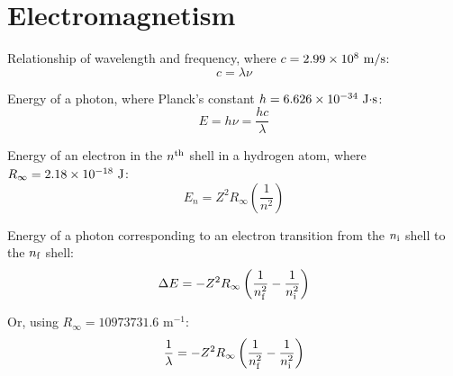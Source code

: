 \documentclass[10pt]{article}
\begin{document}




\newpage
\section{Electromagnetism}


Relationship of wavelength and frequency, where $c=\num{2.99e8}\textnormal{ m/s}$:
\begin{equation*}
c = \lambda\nu
\end{equation*}

Energy of a photon, where Planck's constant $h=\num{6.626e-34}\textnormal{ J$\cdot$s}$:
\begin{equation*}
E = h\nu = \frac{hc}{\lambda}
\end{equation*}

Energy of an electron in the $n^{\textnormal{th}}$ shell in a hydrogen atom, where $R_\infty=\num{2.18e-18}\textnormal{ J}$:
\begin{equation*}
E_n=Z^2R_\infty\left(\frac{1}{n^2}\right)
\end{equation*}

Energy of a photon corresponding to an electron transition from the $n_\textnormal{i}$ shell to the $n_\textnormal{f}$ shell:
\begin{equation*}
\Delta E = -Z^2R_\infty\left(\frac{1}{n_\textnormal{f}^2}-\frac{1}{n_\textnormal{i}^2}\right)
\end{equation*}

Or, using $R_\infty = 10973731.6$ m$^{-1}$:
\begin{equation*}
\frac{1}{\lambda} = -Z^2R_\infty\left(\frac{1}{n_\textnormal{f}^2}-\frac{1}{n_\textnormal{i}^2}\right)
\end{equation*}
\end{document}
